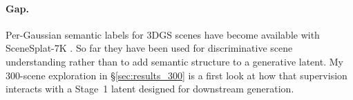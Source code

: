 \paragraph{Gap.} Per-Gaussian semantic labels for 3DGS scenes have become available with SceneSplat-7K \citep{li2025scenesplat}. So far they have been used for discriminative scene understanding rather than to add semantic structure to a generative latent. My 300-scene exploration in \S\ref{sec:results_300} is a first look at how that supervision interacts with a Stage~1 latent designed for downstream generation.